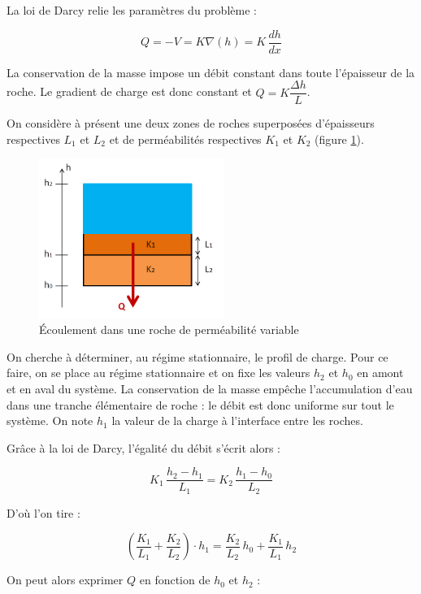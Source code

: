 \documentclass{article}
\begin{document}
La loi de Darcy relie les paramètres du problème :

$$ Q = -V = K\nabla(h) = K\,\frac{dh}{dx} $$


La conservation de la masse impose un débit constant dans toute l’épaisseur de la roche. Le gradient de charge est donc constant et $Q = K\dfrac{\Delta h}{L}$.

On considère à présent une deux zones de roches superposées d’épaisseurs respectives $L_1$ et $L_2$ et de perméabilités respectives $K_1$ et $K_2$ (figure \ref{fig:ecoulement_permea_variable}).

\begin{figure}[H]
    \centering
    \includegraphics[width=6cm]{A_III_B_2.png}
    \caption{Écoulement dans une roche de perméabilité variable}
    \label{fig:ecoulement_permea_variable}
\end{figure}

On cherche à déterminer, au régime stationnaire, le profil de charge. Pour ce faire, on se place au régime stationnaire et on fixe les valeurs $h_2$ et $h_0$ en amont et en aval du système. La conservation de la masse empêche l’accumulation d’eau dans une tranche élémentaire de roche : le débit est donc uniforme sur tout le système. On note $h_1$ la valeur de la charge à l’interface entre les roches.

Grâce à la loi de Darcy, l’égalité du débit s’écrit alors : 

$$ K_1 \,\frac{h_2 - h_1}{L_1} = K_2\, \frac{h_1 - h_0}{L_2} $$

D’où l’on tire :

$$ \left(\frac{K_1}{L_1} + \frac{K_2}{L_2}\right)\cdot h_1 = \frac{K_2}{L_2} \,h_0 + \frac{K_1}{L_1}\, h_2$$

On peut alors exprimer $Q$ en fonction de $h_0$ et $h_2$ :
\end{document}
